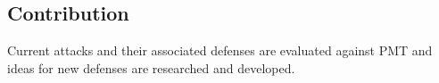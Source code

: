 \subsection{Contribution}
Current attacks and their associated defenses are evaluated against PMT and ideas for new defenses are researched and developed.